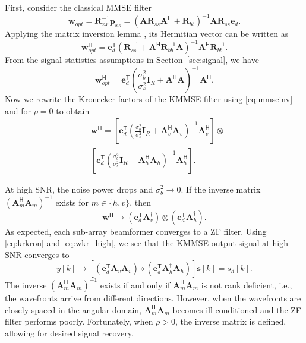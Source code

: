 \documentclass{cta-author}
\newcommand{\tran}{\mathsf{T}}						%
\newcommand{\hermit}{\mathsf{H}}					%
\newcommand{\Rss}{\bm{R}_{ss}}
\newcommand{\Rbb}{\bm{R}_{bb}}
\newcommand{\Rxx}{\bm{R}_{xx}}
\newcommand{\pxs}{\bm{p}_{xs}}
\newcommand{\edes}{\bm{e}_{d}}
\begin{document}
First, consider the classical MMSE filter
\begin{equation}
\bm{w}_{opt} = \Rxx^{-1} \pxs = \left( \bm{A} \Rss \bm{A}^\hermit + \Rbb \right)^{-1} \bm{A} \Rss \edes.
\end{equation}
Applying the matrix inversion lemma \cite{petersen_matrix_2012}, its Hermitian vector can be written as
\begin{equation}
\bm{w}_{opt}^\hermit = \edes^\tran \left( \Rss^{-1} + \bm{A}^\hermit \Rbb^{-1} \bm{A} \right)^{-1} \bm{A}^\hermit \Rbb^{-1}.
\end{equation}
From the signal statistics assumptions in Section~\ref{sec:signal}, we have
\begin{equation} \label{eq:mmseinv}
\bm{w}_{opt}^\hermit = \edes^\tran \left( \frac{\sigma_b^2}{\sigma_s^2} \bm{I}_R + \bm{A}^\hermit \bm{A} \right)^{-1} \bm{A}^\hermit.
\end{equation}
Now we rewrite the Kronecker factors of the KMMSE filter using \eqref{eq:mmseinv} and for $\rho=0$ to obtain
\begin{align}
&\bm{w}^\hermit = \left[ \edes^\tran \left( \frac{\sigma_b^2}{\sigma_s^2} \bm{I}_R + \bm{A}_v^\hermit \bm{A}_v \right)^{-1} \bm{A}_v^\hermit \right] \otimes \\
&\left[ \edes^\tran \left( \frac{\sigma_b^2}{\sigma_s^2} \bm{I}_R + \bm{A}_h^\hermit \bm{A}_h \right)^{-1} \bm{A}_h^\hermit\right]. \label{eq:kmmse_asyn}
\end{align}

At high SNR, the noise power drops and $\sigma_b^2 \rightarrow 0$. If the inverse matrix $(\bm{A}_m^\hermit \bm{A}_m)^{-1}$ exists for $m \in \{h,v\}$, then 
\begin{equation} \label{eq:wkr_high}
	\bm{w}^\hermit \rightarrow \left( \edes^\tran \bm{A}_v^\dagger  \right) \otimes  \left( \edes^\tran \bm{A}_h^\dagger  \right).
\end{equation}
As expected, each sub-array beamformer converges to a ZF filter. Using \eqref{eq:krkron} and \eqref{eq:wkr_high}, we see that the KMMSE output signal at high SNR converges to
\begin{equation}
y[k] \rightarrow \left[ \left( \edes^\tran \bm{A}_v^\dagger \bm{A}_v \right) \diamond \left( \edes^\tran \bm{A}_h^\dagger \bm{A}_h \right) \right] \bm{s}[k] = s_d[k].
\end{equation}
The inverse $(\bm{A}_m^\hermit \bm{A}_m)^{-1}$ exists if and only if $\bm{A}_m^\hermit \bm{A}_m$ is not rank deficient, i.e., the wavefronts arrive from different directions. However, when the wavefronts are closely spaced in the angular domain, $\bm{A}_m^\hermit \bm{A}_m$ becomes ill-conditioned and the ZF filter performs poorly. Fortunately, when $\rho >0$, the inverse matrix is defined, allowing for desired signal recovery.
\end{document}
